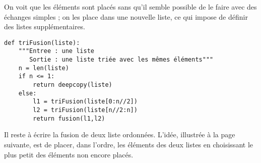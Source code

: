 On voit que les éléments sont placés sans qu'il semble possible de le faire avec des échanges simples ; on les place dans une nouvelle liste, ce qui impose de définir des listes supplémentaires.
\begin{lstlisting}[caption = Tri fusion externe]
def triFusion(liste):
    """Entree : une liste
       Sortie : une liste triée avec les mêmes éléments"""
    n = len(liste)
    if n <= 1:
        return deepcopy(liste)
    else:
        l1 = triFusion(liste[0:n//2])
        l2 = triFusion(liste[n//2:n])
        return fusion(l1,l2)
\end{lstlisting}

Il reste à écrire la fusion de deux liste ordonnées.
L'idée, illustrée à la page suivante,  est de placer, dans l'ordre, les éléments des deux listes en choisissant le plus petit des éléments non encore placés.

\newpage

